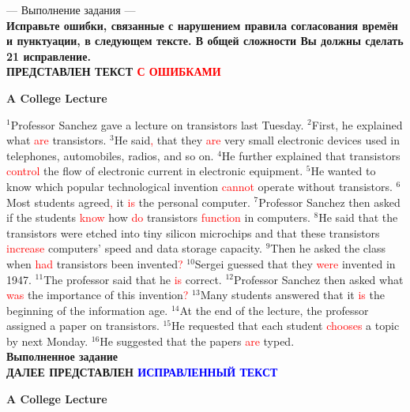 \documentclass[main.tex]{subfiles}
\begin{document}
--- Выполнение задания ---
\\

\textbf{Исправьте ошибки, связанные с нарушением правила согласования времён и пунктуации, в следующем тексте. В общей сложности Вы должны сделать 21 исправление.}
\\

\textbf{ПРЕДСТАВЛЕН ТЕКСТ \textcolor{red}{С ОШИБКАМИ}}

\centerline{\textbf{A College Lecture}}

$^1$Professor Sanchez gave a lecture on transistors last Tuesday.
$^2$First, he explained what \textcolor{red}{are} transistors.
$^3$He said\textcolor{red}{,} that they \textcolor{red}{are} very small electronic devices used in telephones, automobiles, radios, and so on.
$^4$He further explained that transistors \textcolor{red}{control} the flow of electronic current in electronic equipment.
$^5$He wanted to know which popular technological invention \textcolor{red}{cannot} operate without transistors.
$^6$Most students agreed\textcolor{red}{,} it \textcolor{red}{is} the personal computer.
$^7$Professor Sanchez then asked if the students \textcolor{red}{know} how \textcolor{red}{do} transistors \textcolor{red}{function} in computers.
$^8$He said that the transistors were etched into tiny silicon microchips and that these transistors \textcolor{red}{increase} computers' speed and data storage capacity.
$^9$Then he asked the class when \textcolor{red}{had} transistors been invented\textcolor{red}{?}
$^{10}$Sergei guessed that they \textcolor{red}{were} invented in 1947.
$^{11}$The professor said that he \textcolor{red}{is} correct.
$^{12}$Professor Sanchez then asked what \textcolor{red}{was} the importance of this invention\textcolor{red}{?}
$^{13}$Many students answered that it \textcolor{red}{is} the beginning of the information age.
$^{14}$At the end of the lecture, the professor assigned a paper on transistors.
$^{15}$He requested that each student \textcolor{red}{chooses} a topic by next Monday.
$^{16}$He suggested that the papers \textcolor{red}{are} typed.
\\

\textbf{Выполненное задание}
\\

\textbf{ДАЛЕЕ ПРЕДСТАВЛЕН \textcolor{blue}{ИСПРАВЛЕННЫЙ ТЕКСТ}}

\centerline{\textbf{A College Lecture}}
\end{document}
